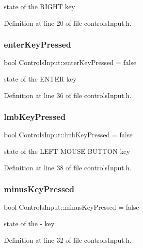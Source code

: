 state of the R\+I\+G\+HT key 

Definition at line 20 of file controls\+Input.\+h.

\mbox{\label{struct_controls_input_a5026bb8fa2c88f2662eb1dba03599143}} 
\subsubsection{\texorpdfstring{enter\+Key\+Pressed}{enterKeyPressed}}
{\footnotesize\ttfamily bool Controls\+Input\+::enter\+Key\+Pressed = false}

state of the E\+N\+T\+ER key 

Definition at line 36 of file controls\+Input.\+h.

\mbox{\label{struct_controls_input_a8b7f874e66eeb9e038c80818feee81a1}} 
\subsubsection{\texorpdfstring{lmb\+Key\+Pressed}{lmbKeyPressed}}
{\footnotesize\ttfamily bool Controls\+Input\+::lmb\+Key\+Pressed = false}

state of the L\+E\+FT M\+O\+U\+SE B\+U\+T\+T\+ON key 

Definition at line 38 of file controls\+Input.\+h.

\mbox{\label{struct_controls_input_a68b463995619f9b9a202dc84301728d0}} 
\subsubsection{\texorpdfstring{minus\+Key\+Pressed}{minusKeyPressed}}
{\footnotesize\ttfamily bool Controls\+Input\+::minus\+Key\+Pressed = false}

state of the -\/ key 

Definition at line 32 of file controls\+Input.\+h.

